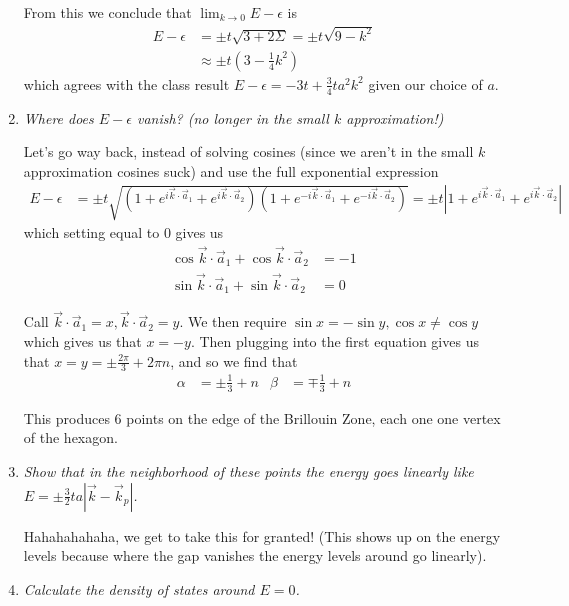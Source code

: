 \documentclass[10pt]{report}
\newcommand{\abs}[1]{\left|#1\right|}
\begin{document}
\begin{enumerate}[1.]
        From this we conclude that $\lim_{k \to 0}E - \epsilon$ is
        \begin{align}
            E - \epsilon &= \pm t\sqrt{3 + 2\Sigma} = \pm t\sqrt{9 - k^2}\\
            &\approx \pm t\left( 3 - \frac{1}{4}k^2 \right)
        \end{align}
        which agrees with the class result $E-\epsilon = -3t + \frac{3}{4}ta^2k^2$ given our choice of $a$. 
    \item \emph{Where does $E - \epsilon$ vanish? (no longer in the small $k$ approximation!)}
        
        Let's go way back, instead of solving cosines (since we aren't in the small $k$ approximation cosines suck) and use the full exponential expression
        \begin{align}
            E - \epsilon &= \pm t\sqrt{\left( 1 + e^{i\vec{k}\cdot\vec{a}_1} + e^{i\vec{k}\cdot\vec{a}_2} \right)\left( 1 + e^{-i\vec{k}\cdot\vec{a}_1} + e^{-i\vec{k}\cdot\vec{a}_2} \right)} = \pm t\abs{1 + e^{i\vec{k}\cdot\vec{a}_1} + e^{i\vec{k}\cdot\vec{a}_2}}
        \end{align}
        which setting equal to $0$ gives us
        \begin{align}
            \cos \vec{k} \cdot \vec{a}_1 + \cos \vec{k} \cdot \vec{a}_2 &= -1\\
            \sin  \vec{k} \cdot \vec{a}_1 + \sin \vec{k} \cdot \vec{a}_2 &= 0
        \end{align}

        Call $\vec{k} \cdot \vec{a}_1 = x, \vec{k} \cdot \vec{a}_2 = y$. We then require $\sin x = -\sin y, \cos x \neq \cos y$ which gives us that $x=-y$. Then plugging into the first equation gives us that $x = y = \pm\frac{2\pi}{3} + 2\pi n$, and so we find that
        \begin{align}
            \alpha &= \pm \frac{1}{3} + n & \beta &= \mp \frac{1}{3} + n
        \end{align}

        This produces $6$ points on the edge of the Brillouin Zone, each one one vertex of the hexagon.

    \item \emph{Show that in the neighborhood of these points the energy goes linearly like $E = \pm \frac{3}{2}ta\abs{\vec{k} - \vec{k}_p}$.}

        Hahahahahaha, we get to take this for granted! (This shows up on the energy levels because where the gap vanishes the energy levels around go linearly).
    \item \emph{Calculate the density of states around $E = 0$.}


\end{enumerate}
\end{document}
